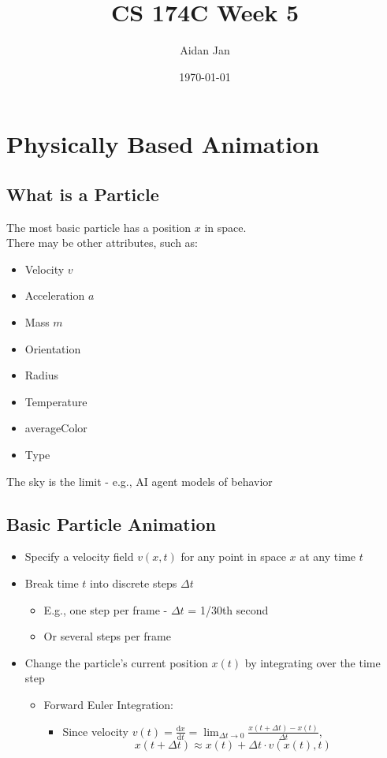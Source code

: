 \documentclass{article}
\title{CS 174C Week 5}
\author{Aidan Jan}
\date{\today}
\newcommand{\der}{\text{d}}
\begin{document}
\maketitle
\section*{Physically Based Animation}
\subsection*{What is a Particle}
The most basic particle has a position $x$ in space.\\
There may be other attributes, such as:
\begin{itemize}
    \item Velocity $v$
    \item Acceleration $a$
    \item Mass $m$
    \item Orientation 
    \item Radius
    \item Temperature
    \item averageColor
    \item Type
\end{itemize}
The sky is the limit - e.g., AI agent models of behavior

\subsection*{Basic Particle Animation}
\begin{itemize}
    \item Specify a velocity field $v(x, t)$ for any point in space $x$ at any time $t$
    \item Break time $t$ into discrete steps $\Delta t$
    \begin{itemize}
        \item E.g., one step per frame - $\Delta t$ = 1/30th second
        \item Or several steps per frame
    \end{itemize}
    \item Change the particle's current position $x(t)$ by integrating over the time step
    \begin{itemize}
        \item Forward Euler Integration:
        \begin{itemize}
            \item Since velocity $v(t) = \frac{\der x}{\der t} = \lim_{\Delta t \rightarrow 0} \frac{x(t + \Delta t) - x(t)}{\Delta t}$,
            \[x(t + \Delta t) \approx x(t) + \Delta t \cdot v(x(t), t)\]
        \end{itemize}
    \end{itemize}
\end{itemize}
\end{document}
